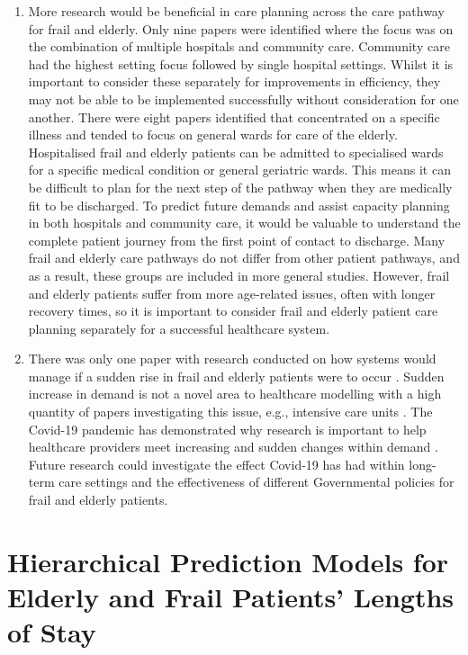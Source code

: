 \documentclass[../thesis.tex]{subfiles}
\begin{document}
\begin{enumerate}
    
\item More research would be beneficial in care planning across the care pathway for frail and elderly. Only nine papers were identified where the focus was on the combination of multiple hospitals and community care.
Community care had the highest setting focus followed by single hospital settings. Whilst it is important to consider these separately for improvements in efficiency, they may not be able to be implemented successfully without consideration for one another.
There were eight papers identified that concentrated on a specific illness and tended to focus on general wards for care of the elderly. Hospitalised frail and elderly patients can be admitted to specialised wards for a specific medical condition or general geriatric wards. This means it can be difficult to plan for the next step of the pathway when they are medically fit to be discharged. To predict future demands and assist capacity planning in both hospitals and community care, it would be valuable to understand the complete patient journey from the first point of contact to discharge. Many frail and elderly care pathways do not differ from other patient pathways, and as a result, these groups are included in more general studies. However, frail and elderly patients suffer from more age-related issues, often with longer recovery times, so it is important to consider frail and elderly patient care planning separately for a successful healthcare system.

\item There was only one paper with research conducted on how systems would manage if a sudden rise in frail and elderly patients were to occur \cite{Arvelo}. Sudden increase in demand is not a novel area to healthcare modelling with a high quantity of papers investigating this issue, e.g., intensive care units \cite{Corke, Kahn, Williams}. The Covid-19 pandemic has demonstrated why research is important to help healthcare providers meet increasing and sudden changes within demand \cite{WHO2023}.
Future research could investigate the effect Covid-19 has had within long-term care settings and the effectiveness of different Governmental policies for frail and elderly patients. 

\end{enumerate}

\section{Hierarchical Prediction Models for Elderly and Frail Patients’ Lengths of Stay}\label{sec:litreview2}
\end{document}
